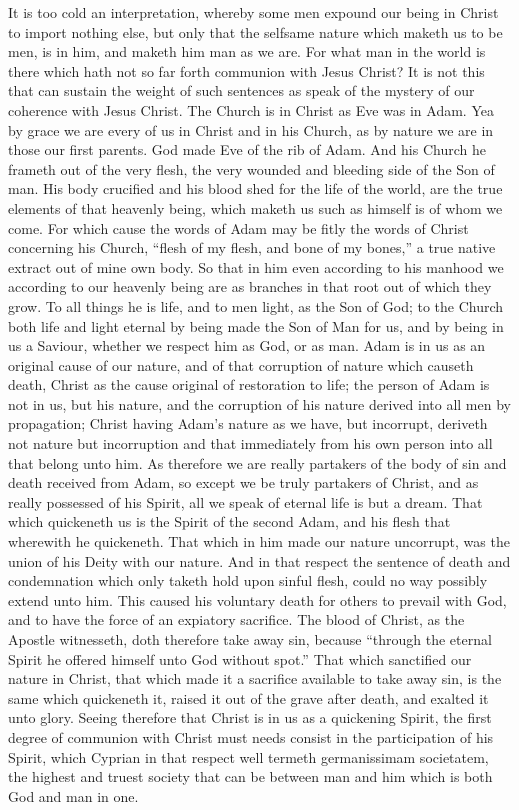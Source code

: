 It is too cold an interpretation, whereby some men expound our being in Christ to import nothing else, but only that the selfsame nature which maketh us to be men, is in him, and maketh him man as we are. For what man in the world is there which hath not so far forth communion with Jesus Christ? It is not this that can sustain the weight of such sentences as speak of the mystery of our coherence with Jesus Christ. The Church is in Christ as Eve was in Adam. Yea by grace we are every of us in Christ and in his Church, as by nature we are in those our first parents. God made Eve of the rib of Adam. And his Church he frameth out of the very flesh, the very wounded and bleeding side of the Son of man. His body crucified and his blood shed for the life of the world, are the true elements of that heavenly being, which maketh us such as himself is of whom we come. For which cause the words of Adam may be fitly the words of Christ concerning his Church, “flesh of my flesh, and bone of my bones,” a true native extract out of mine own body. So that in him even according to his manhood we according to our heavenly being are as branches in that root out of which they grow.
To all things he is life, and to men light, as the Son of God; to the Church both life and light eternal by being made the Son of Man for us, and by being in us a Saviour, whether we respect him as God, or as man. Adam is in us as an original cause of our nature, and of that corruption of nature which causeth death, Christ as the cause original of restoration to life; the person of Adam is not in us, but his nature, and the corruption of his nature derived into all men by propagation; Christ having Adam’s nature as we have, but incorrupt, deriveth not nature but incorruption and that immediately from his own person into all that belong unto him. As therefore we are really partakers of the body of sin and death  received from Adam, so except we be truly partakers of Christ, and as really possessed of his Spirit, all we speak of eternal life is but a dream.
That which quickeneth us is the Spirit of the second Adam, and his flesh that wherewith he quickeneth. That which in him made our nature uncorrupt, was the union of his Deity with our nature. And in that respect the sentence of death and condemnation which only taketh hold upon sinful flesh, could no way possibly extend unto him. This caused his voluntary death for others to prevail with God, and to have the force of an expiatory sacrifice. The blood of Christ, as the Apostle witnesseth, doth therefore take away sin, because “through the eternal Spirit he offered himself unto God without spot.” That which sanctified our nature in Christ, that which made it a sacrifice available to take away sin, is the same which quickeneth it, raised it out of the grave after death, and exalted it unto glory. Seeing therefore that Christ is in us as a quickening Spirit, the first degree of communion with Christ must needs consist in the participation of his Spirit, which Cyprian in that respect well termeth germanissimam societatem, the highest and truest society that can be between man and him which is both God and man in one.
